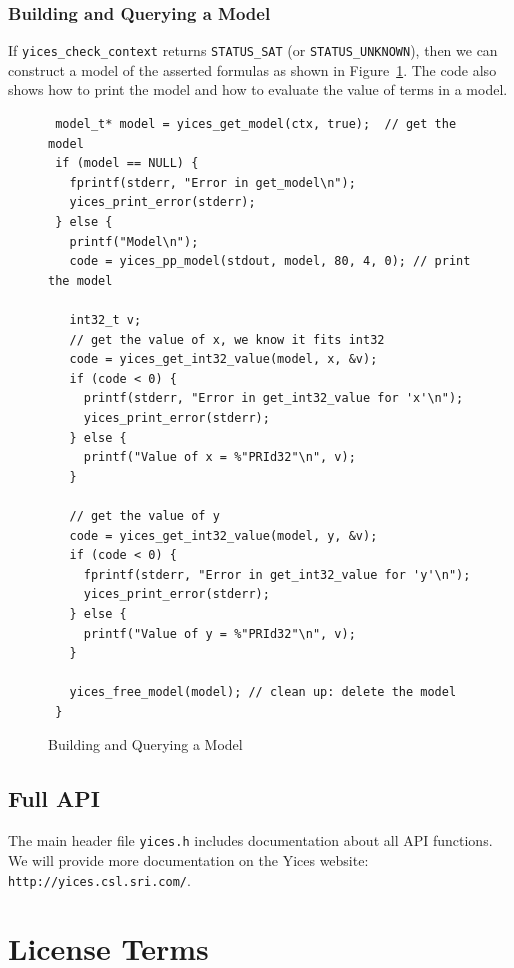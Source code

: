 \documentclass[11pt,twoside,fleqn,openright,titlepage]{cslreport}
\begin{document}
\subsection*{Building and Querying a Model}

If \texttt{yices\_check\_context} returns \texttt{STATUS\_SAT} (or
\texttt{STATUS\_UNKNOWN}), then we can construct a model of the
asserted formulas as shown in Figure~\ref{model-query}. The code also
shows how to print the model and how to evaluate the value of terms in
a model.

\begin{figure}
\begin{footnotesize}
\begin{verbatim}
 model_t* model = yices_get_model(ctx, true);  // get the model
 if (model == NULL) {
   fprintf(stderr, "Error in get_model\n");
   yices_print_error(stderr);
 } else {
   printf("Model\n");
   code = yices_pp_model(stdout, model, 80, 4, 0); // print the model

   int32_t v;
   // get the value of x, we know it fits int32
   code = yices_get_int32_value(model, x, &v);
   if (code < 0) {
     printf(stderr, "Error in get_int32_value for 'x'\n");
     yices_print_error(stderr);
   } else {
     printf("Value of x = %"PRId32"\n", v);
   }

   // get the value of y
   code = yices_get_int32_value(model, y, &v);
   if (code < 0) {
     fprintf(stderr, "Error in get_int32_value for 'y'\n");
     yices_print_error(stderr);
   } else {
     printf("Value of y = %"PRId32"\n", v);
   }

   yices_free_model(model); // clean up: delete the model
 }
\end{verbatim}
\end{footnotesize}
\caption{Building and Querying a Model}
\label{model-query}
\end{figure}


\section{Full API}

The main header file \texttt{yices.h} includes documentation about all
API functions. We will provide more documentation on the Yices
website: \texttt{http://yices.csl.sri.com/}.

\newpage



\appendix
\chapter{License Terms}
\label{license}
\end{document}
